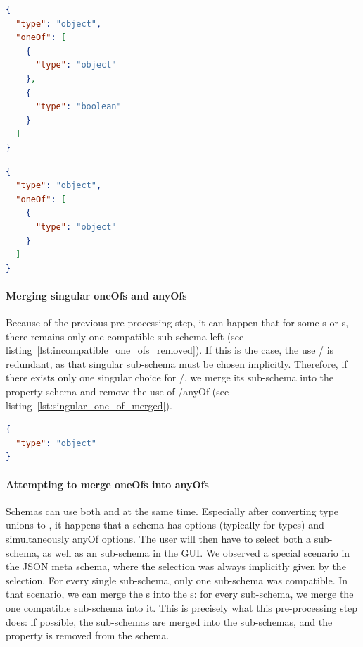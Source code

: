 \begin{lstlisting}[language=json, firstnumber=1, caption=
    {Simple JSON schema with incompatible oneOf option}, captionpos=b, label={lst:incompatible_one_ofs}]
{
  "type": "object",
  "oneOf": [
    {
      "type": "object"
    },
    {
      "type": "boolean"
    }
  ]
}
\end{lstlisting}


\begin{lstlisting}[language=json, firstnumber=1, caption=
    {Simple JSON schema with incompatible oneOf option removed}, captionpos=b, label={lst:incompatible_one_ofs_removed}]
{
  "type": "object",
  "oneOf": [
    {
      "type": "object"
    }
  ]
}
\end{lstlisting}


\paragraph{Merging singular oneOfs and anyOfs}
Because of the previous pre-processing step, it can happen that for some s or s, there remains
only one compatible sub-schema left (see listing~\ref{lst:incompatible_one_ofs_removed}).
If this is the case, the use / is redundant, as that singular sub-schema must be chosen implicitly.
Therefore, if there exists only one singular choice for /, we merge its sub-schema into the property schema
and remove the use of /anyOf (see listing~\ref{lst:singular_one_of_merged}).

\begin{lstlisting}[language=json, firstnumber=1, caption=
    {Simple JSON schema with singular oneOf merged into property schema}, captionpos=b, label={lst:singular_one_of_merged}]
{
  "type": "object"
}
\end{lstlisting}


\paragraph{Attempting to merge oneOfs into anyOfs}
Schemas can use both  and  at the same time.
Especially after converting type unions to , it happens that a schema has  options (typically for types) and simultaneously anyOf options.
The user will then have to select both a  sub-schema, as well as an  sub-schema in the GUI\@.
We observed a special scenario in the JSON meta schema, where the  selection was always implicitly given by the  selection.
For every single  sub-schema, only one  sub-schema was compatible.
In that scenario, we can merge the s into the s: for every  sub-schema, we merge the one compatible  sub-schema into it.
This is precisely what this pre-processing step does: if possible, the  sub-schemas are merged into the  sub-schemas, and the  property is removed from the schema.


